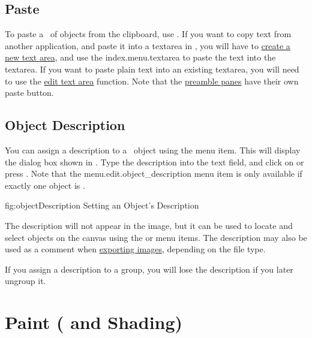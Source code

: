 \section{Paste}\label{sec:pasteobjects}


To paste a \selection\ of \glspl{object} from the clipboard, use
. If you want to copy text from another
application, and paste it into a \gls{textarea} in \FlowframTk, you
will have to \hyperref[sec:newtext]{create a new text area}, and
use the \gls{index.menu.textarea} to paste the text into the
\gls*{textarea}.  If you want to paste plain text into an existing
\gls*{textarea}, you will need to use the
\hyperref[sec:edittext]{edit text area} function.  Note that the
\hyperref[sec:preamble]{preamble panes} have their own paste button.

\section{Object Description}\label{sec:objectdescription}


You can assign a description to a \selected\ \gls*{object} using the
 menu item. This will display the
dialog box shown in . Type the
description into the text field, and click on  or press
.  Note that the \gls{menu.edit.object_description}
menu item is only available if exactly one object is \selected.

\FloatFig
  {fig:objectDescription}
  {}
  {Setting an Object's Description}

The description will not appear in the image, but it can be used to
locate and select \glspl*{object} on the canvas using the
 or
 menu items. The description
may also be used as a comment when
\hyperref[sec:exportimage]{exporting images}, depending on the
file type.

\begin{important}
If you assign a description to a \gls{group},
you will lose the description if you later ungroup it.
\end{important}

\chapter{Paint ( and Shading)}
\label{sec:paintcolourandshading}

